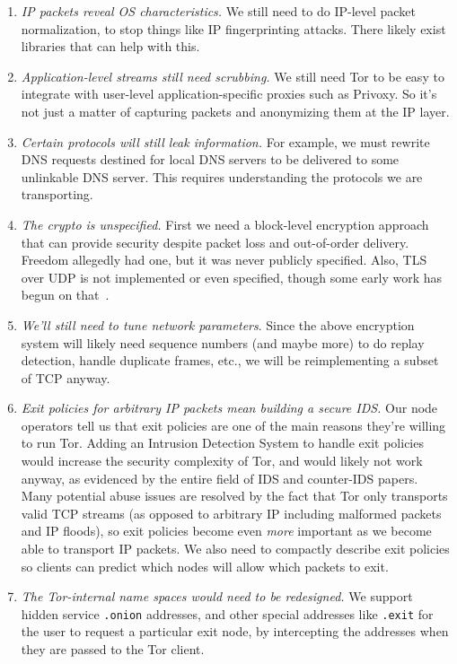 \documentclass{llncs}
\begin{document}
\begin{enumerate}
\setlength{\itemsep}{0mm}
\setlength{\parsep}{0mm}
\item \emph{IP packets reveal OS characteristics.} We still need to do
IP-level packet normalization, to stop things like IP fingerprinting
attacks. There likely exist libraries that can help with this.
\item \emph{Application-level streams still need scrubbing.} We still need
Tor to be easy to integrate with user-level application-specific proxies
such as Privoxy. So it's not just a matter of capturing packets and
anonymizing them at the IP layer.
\item \emph{Certain protocols will still leak information.} For example,
we must rewrite DNS requests destined for local DNS servers to
be delivered to some unlinkable DNS server. This requires
understanding the protocols we are transporting.
\item \emph{The crypto is unspecified.} First we need a block-level encryption
approach that can provide security despite
packet loss and out-of-order delivery. Freedom allegedly had one, but it was
never publicly specified.
Also, TLS over UDP is not implemented or even
specified, though some early work has begun on that~\cite{dtls}.
\item \emph{We'll still need to tune network parameters}. Since the above
encryption system will likely need sequence numbers (and maybe more) to do
replay detection, handle duplicate frames, etc., we will be reimplementing
a subset of TCP anyway.
\item \emph{Exit policies for arbitrary IP packets mean building a secure
IDS\@.}  Our node operators tell us that exit policies are one of
the main reasons they're willing to run Tor.
Adding an Intrusion Detection System to handle exit policies would
increase the security complexity of Tor, and would likely not work anyway,
as evidenced by the entire field of IDS and counter-IDS papers. Many
potential abuse issues are resolved by the fact that Tor only transports
valid TCP streams (as opposed to arbitrary IP including malformed packets
and IP floods), so exit policies become even \emph{more} important as
we become able to transport IP packets. We also need to compactly
describe exit policies so clients can predict
which nodes will allow which packets to exit.
\item \emph{The Tor-internal name spaces would need to be redesigned.} We
support hidden service {\tt{.onion}} addresses, and other special addresses
like {\tt{.exit}} for the user to request a particular exit node,
by intercepting the addresses when they are passed to the Tor client.
\end{enumerate}
\end{document}
